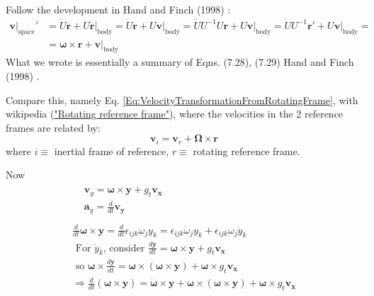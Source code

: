 \documentclass[10pt]{amsart}
\begin{document}
\begin{multicols*}{2}
Follow the development in Hand and Finch (1998) \cite{HaFi1998}:
\begin{equation}
\begin{aligned}
\left. \mathbf{v} \right|_{\text{space}}' & = \dot{U} \mathbf{r} + \left. U \dot{\mathbf{r} }\right|_{\text{body}} = \dot{U} \mathbf{r} + \left. U \mathbf{v} \right|_{\text{body}} = \dot{U} U^{-1} U \mathbf{r} + \left. U \mathbf{v} \right|_{\text{body}} = \dot{U} U^{-1} \mathbf{r}' + U \left. \mathbf{v} \right|_{\text{body}} = \\
& = \mathbf{\omega} \times \mathbf{r} + \left. \mathbf{v} \right|_{\text{body}}
\end{aligned}
\end{equation}
What we wrote is essentially a summary of Eqns. (7.28), (7.29)  Hand and Finch (1998) \cite{HaFi1998}. 

Compare this, namely Eq. \ref{Eq:VelocityTransformationFromRotatingFrame}, with wikipedia (\href{https://en.wikipedia.org/wiki/Rotating_reference_frame}{"Rotating reference frame"}), where the velocities in the 2 reference frames are related by:
\begin{equation}
	\mathbf{v}_i = \mathbf{v}_r + \mathbf{\Omega} \times \mathbf{r}
\end{equation}
where $i \equiv $ inertial frame of reference, $r \equiv $ rotating reference frame.

Now
\[
\begin{gathered}
\begin{aligned}
& \mathbf{v}_y = \mathbf{\omega} \times \mathbf{y} + g_t \mathbf{v}_{\mathbf{x}} \\
& \mathbf{a}_y = \frac{d}{dt} \mathbf{v}_{\mathbf{y}} \\
\end{aligned} \\
\frac{d}{dt} \mathbf{\omega} \times \mathbf{y} = \frac{d}{dt} \epsilon_{ijk} \omega_j y_k = \epsilon_{ijk} \dot{\omega}_j y_k + \epsilon_{ijk} \omega_j \dot{y}_k  \\
\text{ For $\dot{y}_k$, consider } \frac{d\mathbf{y}}{dt} = \mathbf{\omega} \times \mathbf{y} + g_t \mathbf{v}_{\mathbf{x}} \\
\text{ so } \mathbf{\omega} \times \frac{d\mathbf{y}}{dt} = \mathbf{\omega} \times ( \mathbf{\omega} \times \mathbf{y} ) + \mathbf{\omega} \times g_t \mathbf{v}_{\mathbf{x}} \\
\Longrightarrow \frac{d}{dt} (\mathbf{\omega} \times \mathbf{y}) = \dot{\mathbf{\omega} } \times \mathbf{y} + \mathbf{\omega} \times (\mathbf{\omega} \times \mathbf{y} ) + \mathbf{\omega} \times g_t \mathbf{v}_{\mathbf{x}}
\end{gathered}
\]



\end{multicols*}
\end{document}
